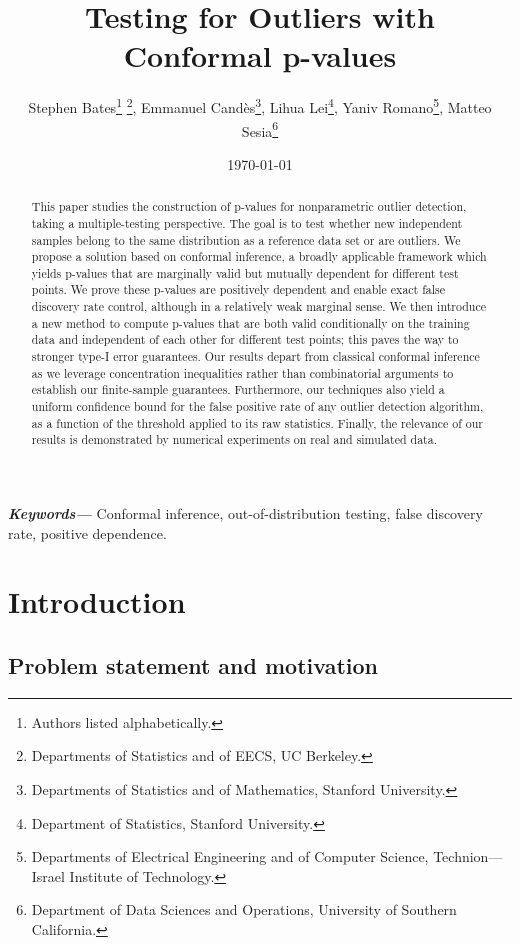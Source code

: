 \documentclass[11pt]{article}
\title{Testing for Outliers with Conformal p-values}
\author{Stephen Bates\footnote{Authors listed alphabetically.} \thanks{Departments of Statistics and of EECS, UC Berkeley.}, Emmanuel Cand{\`e}s\thanks{Departments of Statistics and of Mathematics, Stanford University.}, Lihua Lei\thanks{Department of Statistics, Stanford University.}, Yaniv Romano\thanks{Departments of Electrical Engineering and of Computer Science, Technion---Israel Institute of Technology.}, Matteo Sesia\thanks{Department of Data Sciences and Operations, University of Southern California.}}
\date{\today}
\providecommand{\keywords}[1]
{
  \small	
  \textbf{\textit{Keywords---}} #1
}
\begin{document}
\maketitle

\begin{abstract}
This paper studies the construction of p-values for nonparametric outlier detection, taking a multiple-testing perspective. The goal is to test whether new independent samples belong to the same distribution as a reference data set or are outliers. We propose a solution based on conformal inference, a broadly applicable framework which yields p-values that are marginally valid but mutually dependent for different test points. We prove these p-values are positively dependent and enable exact false discovery rate control, although in a relatively weak marginal sense. We then introduce a new method to compute p-values that are both valid conditionally on the training data and independent of each other for different test points; this paves the way to stronger type-I error guarantees. Our results depart from classical conformal inference as we leverage concentration inequalities rather than combinatorial arguments to establish our finite-sample guarantees. Furthermore, our techniques also yield a uniform confidence bound for the false positive rate of any outlier detection algorithm, as a function of the threshold applied to its raw statistics. Finally, the relevance of our results is demonstrated by numerical experiments on real and simulated data.
\end{abstract}

\keywords{Conformal inference, out-of-distribution testing, false discovery rate, positive dependence.}

\section{Introduction}

\subsection{Problem statement and motivation}
\end{document}
